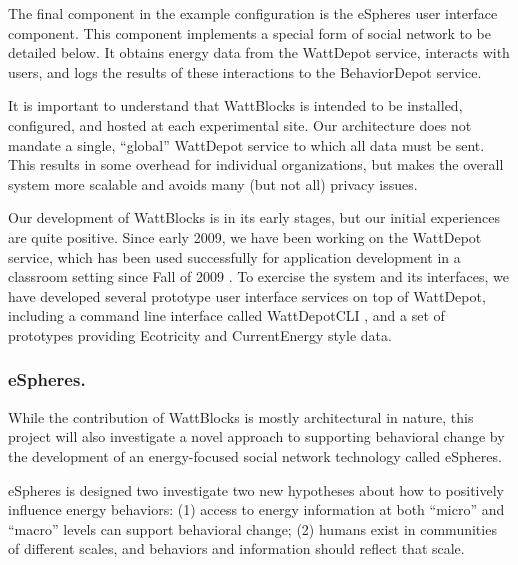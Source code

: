 The final component in the example configuration is the eSpheres user
interface component.  This component implements a special form of social
network to be detailed below. It obtains energy data from the WattDepot service,
interacts with users, and logs the results of these interactions to the
BehaviorDepot service.

It is important to understand that WattBlocks is intended to be installed,
configured, and hosted at each experimental site.  Our architecture does
not mandate a single, ``global'' WattDepot service to which all data
must be sent.  This results in some overhead for
individual organizations, but makes the overall system more scalable and
avoids many (but not all) privacy issues.


Our development of WattBlocks is in its early stages, but our initial
experiences are quite positive.  Since early 2009, we have been working on
the WattDepot service, which has been used successfully for application
development in a classroom setting since Fall of 2009 \cite{WattDepot}.  To
exercise the system and its interfaces, we have developed several prototype
user interface services on top of WattDepot, including a command line
interface called WattDepotCLI \cite{WattDepotCLI}, and a set of prototypes
providing Ecotricity \cite{Ecotricity} and CurrentEnergy
\cite{CurrentEnergy} style data.




\subsubsection{eSpheres.}

While the contribution of WattBlocks is mostly architectural in nature,
this project will also investigate a novel approach to supporting
behavioral change by the development of an energy-focused social network
technology called eSpheres.

eSpheres is designed two investigate two new hypotheses about how to
positively influence energy behaviors: (1) access to energy information at
both ``micro'' and ``macro'' levels can support behavioral change; (2)
humans exist in communities of different scales, and behaviors and
information should reflect that scale.

